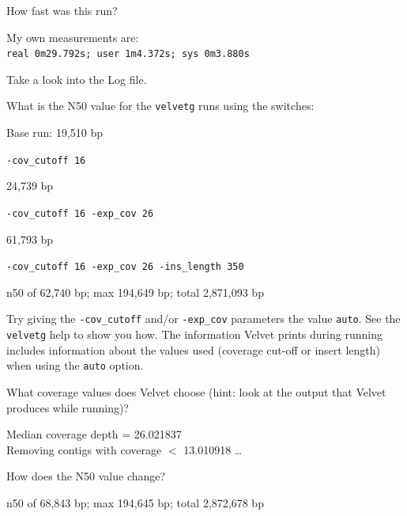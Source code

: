 \begin{questions}
How fast was this run?
\begin{answer}
My own measurements are:\\
\texttt{real    0m29.792s; user    1m4.372s; sys     0m3.880s}
\end{answer}

\end{questions}

\begin{steps}
Take a look into the Log file.
\end{steps}

\begin{questions}
What is the N50 value for the \texttt{velvetg} runs using the switches:\\
\begin{answer}
Base run: 19,510 bp
\end{answer}
\texttt{-cov\_cutoff 16}
\begin{answer}
24,739 bp
\end{answer}

\texttt{-cov\_cutoff 16 -exp\_cov 26}
\begin{answer}
61,793 bp
\end{answer}

\texttt{-cov\_cutoff 16 -exp\_cov 26 -ins\_length 350}
\begin{answer}
n50 of 62,740 bp; max 194,649 bp; total 2,871,093 bp
\end{answer}

\end{questions}

\begin{steps}
Try giving the \texttt{-cov\_cutoff} and/or \texttt{-exp\_cov} parameters the
value \texttt{auto}. See the \texttt{velvetg} help to show you how. The
information Velvet prints during running includes information about the values
used (coverage cut-off or insert length) when using the \texttt{auto} option.
\end{steps}

\begin{questions}
What coverage values does Velvet choose (hint: look at the output that Velvet
produces while running)?
\begin{answer}
Median coverage depth = 26.021837\\
Removing contigs with coverage $<$ 13.010918 \ldots
\end{answer}

How does the N50 value change?
\begin{answer}
n50 of 68,843 bp; max 194,645 bp; total 2,872,678 bp
\end{answer}
\end{questions}

